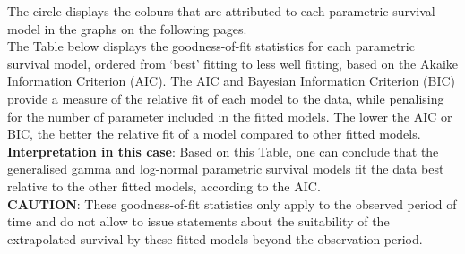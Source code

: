 \documentclass[]{article}
\begin{document}
The circle displays the colours that are attributed to each parametric
survival model in the graphs on the following pages.\\
The Table below displays the goodness-of-fit statistics for each
parametric survival model, ordered from `best' fitting to less well
fitting, based on the Akaike Information Criterion (AIC). The AIC and
Bayesian Information Criterion (BIC) provide a measure of the relative
fit of each model to the data, while penalising for the number of
parameter included in the fitted models. The lower the AIC or BIC, the
better the relative fit of a model compared to other fitted models.\\
\textbf{Interpretation in this case}: Based on this Table, one can
conclude that the generalised gamma and log-normal parametric survival
models fit the data best relative to the other fitted models, according
to the AIC.\\
\textbf{CAUTION}: These goodness-of-fit statistics only apply to the
observed period of time and do not allow to issue statements about the
suitability of the extrapolated survival by these fitted models beyond
the observation period.
\end{document}
